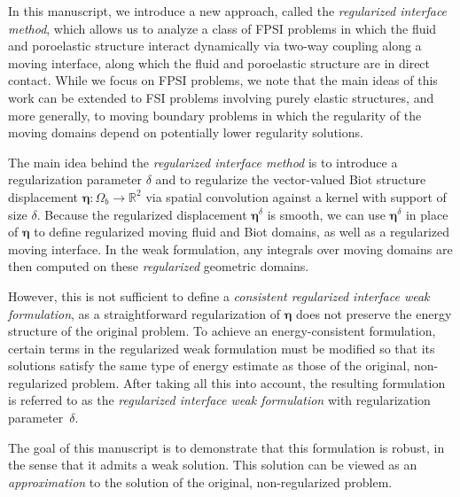 \documentclass[11pt]{article}
\newcommand{\bd}{\boldsymbol}
\def\R{{\mathbb R}}
\theoremstyle{definition}
\begin{document}

In this manuscript, we introduce a new approach, called the \textit{regularized interface method}, which allows us to analyze a class of FPSI problems in which the fluid and poroelastic structure interact dynamically via two-way coupling along a moving interface, along which the fluid and poroelastic structure are in direct contact. 
While we focus on FPSI problems, we note that  the main ideas of this work can be extended to FSI problems involving purely elastic structures, and more generally,  to moving boundary problems in which the regularity of the moving domains depend on potentially lower regularity solutions.

The main idea behind the \textit{regularized interface method} is to introduce a regularization parameter $\delta$ and to regularize the vector-valued Biot structure displacement $\bd{\eta}: \Omega_{b} \to \R^{2}$ via spatial convolution against a kernel with support of size $\delta$.
%
Because the regularized displacement $\bd{\eta}^\delta$ is smooth, we can use $\bd{\eta}^\delta$ in place of $\bd{\eta}$ to define regularized moving fluid and Biot domains, as well as a regularized moving interface. In the weak formulation, any integrals over moving domains are then computed on these \textit{regularized} geometric domains.

{{However, this is not sufficient to define a {\emph{consistent regularized interface weak formulation}}, as a straightforward regularization of $\bd{\eta}$ does not preserve the energy structure of the original problem. To achieve an energy-consistent formulation, certain terms in the regularized weak formulation must be modified so that its solutions satisfy the same type of energy estimate as those of the original, non-regularized problem.}}
%
After taking all this into account, the resulting formulation is referred to as the \textit{regularized interface weak formulation} with regularization parameter~$\delta$.

The goal of this manuscript is to demonstrate that this formulation is robust, in the sense that it admits a weak solution. This solution can be viewed as an {\emph{approximation}} to the solution of the original, non-regularized problem. 
\end{document}
